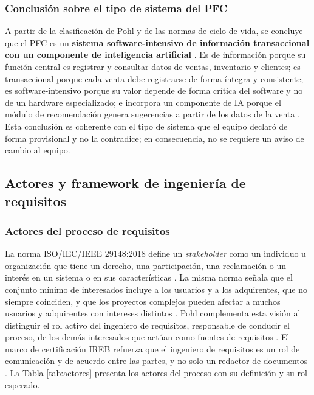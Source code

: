 \documentclass[onecolumn,12pt,a4paper]{IEEEtran}
\begin{document}
\subsubsection{Conclusi\'on sobre el tipo de sistema del PFC}
A partir de la clasificaci\'on de Pohl y de las normas de ciclo de vida, se concluye que el PFC es un \textbf{sistema software-intensivo de informaci\'on transaccional con un componente de inteligencia artificial} \cite{pohl2025,iso15288,iso12207}. Es de informaci\'on porque su funci\'on central es registrar y consultar datos de ventas, inventario y clientes; es transaccional porque cada venta debe registrarse de forma \'integra y consistente; es software-intensivo porque su valor depende de forma cr\'itica del software y no de un hardware especializado; e incorpora un componente de IA porque el m\'odulo de recomendaci\'on genera sugerencias a partir de los datos de la venta \cite{pohl2025,swebok4}. Esta conclusi\'on es coherente con el tipo de sistema que el equipo declar\'o de forma provisional y no la contradice; en consecuencia, no se requiere un aviso de cambio al equipo.

\subsection{Actores y framework de ingenier\'ia de requisitos}

\subsubsection{Actores del proceso de requisitos}
La norma ISO/IEC/IEEE 29148:2018 define un \emph{stakeholder} como un individuo u organizaci\'on que tiene un derecho, una participaci\'on, una reclamaci\'on o un inter\'es en un sistema o en sus caracter\'isticas \cite{iso29148}. La misma norma se\~nala que el conjunto m\'inimo de interesados incluye a los usuarios y a los adquirentes, que no siempre coinciden, y que los proyectos complejos pueden afectar a muchos usuarios y adquirentes con intereses distintos \cite{iso29148}. Pohl complementa esta visi\'on al distinguir el rol activo del ingeniero de requisitos, responsable de conducir el proceso, de los dem\'as interesados que act\'uan como fuentes de requisitos \cite{pohl2025}. El marco de certificaci\'on IREB refuerza que el ingeniero de requisitos es un rol de comunicaci\'on y de acuerdo entre las partes, y no solo un redactor de documentos \cite{ireb2023}. La Tabla \ref{tab:actores} presenta los actores del proceso con su definici\'on y su rol esperado.
\end{document}
